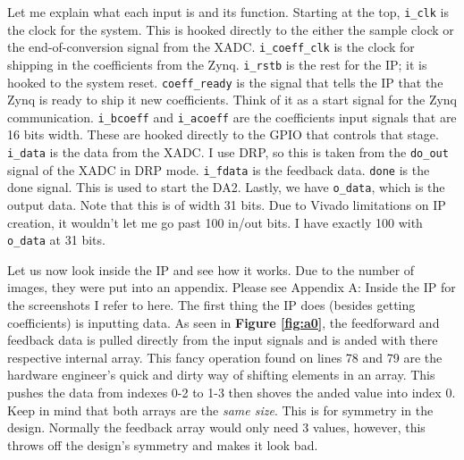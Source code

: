 \documentclass[12pt,a4paper,titlepage]{article}
\begin{document}
Let me explain what each input is and its function. Starting at the top,
\texttt{i\_clk} is the clock for the system. This is hooked directly to the
either the sample clock or the end-of-conversion signal from the
XADC. \texttt{i\_coeff\_clk} is the clock for shipping in the coefficients from
the Zynq. \texttt{i\_rstb} is the rest for the IP; it is hooked to the system
reset. \texttt{coeff\_ready} is the signal that tells the IP that the Zynq is
ready to ship it new coefficients. Think of it as a start signal for the Zynq
communication. \texttt{i\_bcoeff} and \texttt{i\_acoeff} are the coefficients
input signals that are 16 bits width. These are hooked directly to the GPIO that
controls that stage. \texttt{i\_data} is the data from the XADC. I use DRP, so
this is taken from the \texttt{do\_out} signal of the XADC in DRP
mode. \texttt{i\_fdata} is the feedback data. \texttt{done} is the done
signal. This is used to start the DA2. Lastly, we have \texttt{o\_data}, which
is the output data. Note that this is of width 31 bits. Due to Vivado
limitations on IP creation, it wouldn't let me go past 100 in/out bits. I have
exactly 100 with \texttt{o\_data} at 31 bits.

Let us now look inside the IP and see how it works. Due to the number of images,
they were put into an appendix. Please see Appendix A: Inside the IP for the
screenshots I refer to here. The first thing the IP does (besides getting
coefficients) is inputting data. As seen in \textbf{Figure \ref{fig:a0}}, the
feedforward and feedback data is pulled directly from the input signals and
is anded with there respective internal array. This fancy operation found on
lines 78 and 79 are the hardware engineer's quick and dirty way of shifting
elements in an array. This pushes the data from indexes 0-2 to 1-3 then shoves
the anded value into index 0. Keep in mind that both arrays are the \emph{same
  size}. This is for symmetry in the design. Normally the feedback array would
only need 3 values, however, this throws off the design's symmetry and makes it
look bad.
\end{document}
